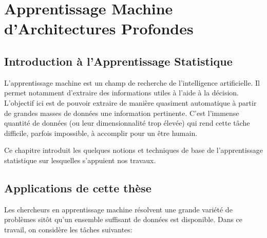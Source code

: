 \chapter{Apprentissage Machine d'Architectures Profondes}
\label{chap:basic}

\section{Introduction à l'Apprentissage Statistique}

L'apprentissage machine est un champ de recherche de l'intelligence
artificielle. Il permet notamment d'extraire des informations utiles à l'aide à
la décision.  L'objectif ici est de pouvoir extraire de manière quasiment
automatique à partir de grandes masses de données une information pertinente.
C'est l'immense quantité de données (ou leur dimensionnalité trop élevée)  qui
rend cette tâche difficile, parfois impossible, à accomplir pour un être
humain.

Ce chapitre introduit les quelques notions et techniques de base de
l'apprentissage statistique sur lesquelles s'appuient nos travaux.

\section{Applications de cette thèse}

Les chercheurs en apprentissage machine résolvent une grande variété de
problèmes sitôt qu'un ensemble suffisant de données est disponible. Dans ce
travail, on considère les tâches suivantes:
\\

